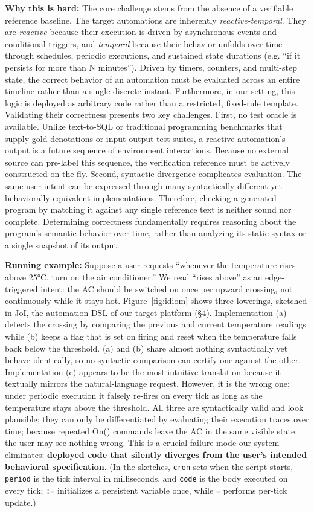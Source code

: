 \documentclass[sigconf,nonacm,anonymous,review]{acmart}
\begin{document}
\textbf{Why this is hard:} The core challenge stems from the absence of a verifiable reference baseline. The target automations are inherently \emph{reactive-temporal}. They are \emph{reactive} because their execution is driven by asynchronous events and conditional triggers,
and \emph{temporal} because their behavior unfolds over time through schedules, periodic executions, and sustained state durations (e.g. ``if it persists for more than N minutes'').
Driven by timers, counters, and multi-step state, the correct behavior of an automation must be evaluated across an entire timeline rather than a single discrete instant. Furthermore, in our setting, this logic is deployed as arbitrary code rather than a restricted, fixed-rule template.
Validating their correctness presents two key challenges. First, no test oracle is available. 
Unlike text-to-SQL or traditional programming benchmarks that supply gold denotations or input-output test suites, a reactive automation's output is a future sequence of environment interactions. Because no external source can pre-label this sequence, the verification reference must be actively constructed on the fly. 
Second, syntactic divergence complicates evaluation. The same user intent can be expressed through many syntactically different yet behaviorally equivalent implementations. Therefore, checking a generated program by matching it against any single reference text is neither sound nor complete. Determining correctness fundamentally requires reasoning about the program’s semantic behavior over time, rather than analyzing its static syntax or a single snapshot of its output.

\textbf{Running example:} Suppose a user requests ``whenever the temperature rises above 25°C, turn on the air conditioner.'' We read ``rises above'' as an edge-triggered intent: the AC should be switched on once per upward crossing, not continuously while it stays hot. Figure~\ref{fig:idiom} shows three lowerings, sketched in JoI, the automation DSL of our target platform (\S4). Implementation (a) detects the crossing by comparing the previous and current temperature readings while (b) keeps a flag that is set on firing and reset when the temperature falls back below the threshold. (a) and (b) share almost nothing syntactically yet behave identically, so no syntactic comparison can certify one against the other. Implementation (c) appears to be the most intuitive translation because it textually mirrors the natural-language request. However, it is the wrong one: under periodic execution it falsely re-fires on every tick as long as the temperature stays above the threshold. All three are syntactically valid and look plausible; they can only be differentiated by evaluating their execution traces over time; because repeated On() commands leave the AC in the same visible state, the user may see nothing wrong. This is a crucial failure mode our system eliminates: \textbf{deployed code that silently diverges from the user's intended behavioral specification}. (In the sketches, \texttt{cron} sets when the script starts, \texttt{period} is the tick interval in milliseconds, and \texttt{code} is the body executed on every tick; \texttt{:=} initializes a persistent variable once, while \texttt{=} performs per-tick update.)
\end{document}
